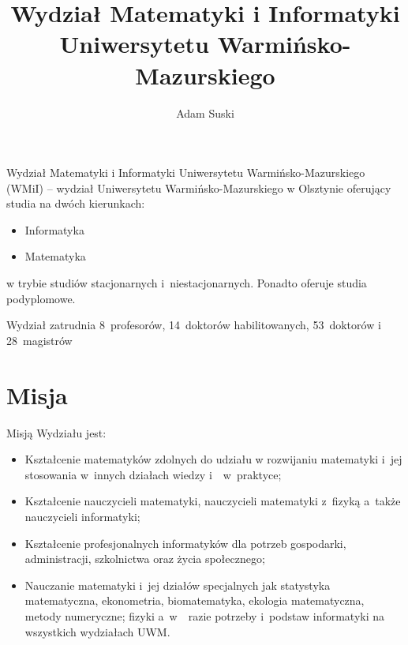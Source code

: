 \documentclass[a4paper,11pt]{article}
\title{Wydział Matematyki i Informatyki Uniwersytetu
Warmińsko-Mazurskiego
}
\author{Adam Suski}
\begin{document}
\maketitle
\begin{abstract}

\end{abstract}

Wydział Matematyki i Informatyki Uniwersytetu Warmińsko-Mazurskiego (WMiI) – wydział
Uniwersytetu Warmińsko-Mazurskiego w Olsztynie oferujący studia na dwóch kierunkach:
\begin{itemize}

\item Informatyka

\item Matematyka
\end{itemize}
w trybie studiów stacjonarnych i~niestacjonarnych. Ponadto oferuje studia podyplomowe.

Wydział zatrudnia 8~profesorów, 14~doktorów habilitowanych, 53~doktorów i 28~magistrów

\tableofcontents

\section{Misja} 
Misją Wydziału jest:
\begin{itemize}
\item Kształcenie matematyków zdolnych do udziału w rozwijaniu matematyki i~jej stosowania w~innych
działach wiedzy i~~w~praktyce;

\item Kształcenie nauczycieli matematyki, nauczycieli matematyki z~fizyką a~także nauczycieli informatyki;

\item Kształcenie profesjonalnych informatyków dla potrzeb gospodarki, administracji, szkolnictwa oraz życia
społecznego;

\item Nauczanie matematyki i~jej działów specjalnych jak statystyka matematyczna, ekonometria,
biomatematyka, ekologia matematyczna, metody numeryczne; fizyki a~w~~razie potrzeby i~podstaw
informatyki na wszystkich wydziałach UWM.
\end{itemize}
\end{document}
